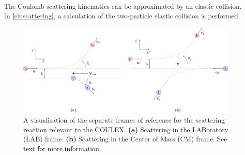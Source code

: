 \documentclass[twoside,english]{uiofysmaster/uiofysmaster}
\let\orgautoref\autoref
\renewcommand{\autoref}
        {%
		 \def\sectionautorefname{Section}%
		 \def\subsectionautorefname{Section}%
		 \def\subsubsectionautorefname{Section}%
		 \def\chapterautorefname{Chapter}%
          \orgautoref}
\begin{document}
The Coulomb scattering kinematics can be approximated by an elastic collision.
In \autoref{ch:scattering}, a calculation of the two-particle elastic collision is performed.

\begin{figure}[htb]
	\centering
	\includegraphics[width=\textwidth]{Images/scattering.png}
	\caption{A visualisation of the separate frames of reference for the scattering reaction relevant to the COULEX.
	\textbf{(a)} Scattering in the LABoratory (LAB) frame. 
	\textbf{(b)} Scattering in the Center of Mass (CM) frame. 
	See text for more information.}
	\label{fig:scattering}
\end{figure}

%		
%		
\end{document}
